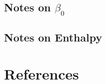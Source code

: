 \documentclass[11pt]{book}    %
\begin{document}
\chapter{Notes on $\beta_0$}


\chapter{Notes on Enthalpy}


\backmatter

\part{References}

\renewcommand\bibname{References}


\end{document}
